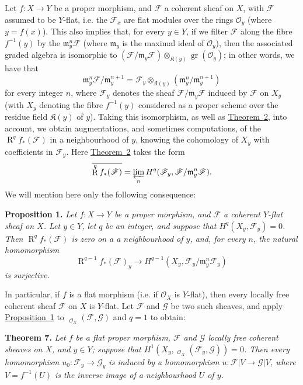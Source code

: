 \documentclass{article}
\newenvironment{itenv}[1]
  {\phantomsection\par\medskip\noindent\textbf{#1.}\itshape}
  {\medskip}
\newcommand{\scr}[1]{{\mathscr{#1}}}
\newcommand{\fk}{\mathfrak}
\newcommand{\kres}{\mathfrak{K}}
\DeclareMathOperator{\RR}{R}
\DeclareMathOperator{\Hom}{Hom}
\DeclareMathOperator{\shHom}{\underline{\Hom}}
\DeclareMathOperator{\gr}{gr}
\newcommand{\oldpage}[1]{\marginpar{\footnotesize$\Big\vert$ \textit{p.~#1}}}
\begin{document}
Let $f\colon X\to Y$ be a proper morphism, and $\scr{F}$ a coherent sheaf on $X$,
\oldpage{182-09}
with $\scr{F}$ assumed to be $Y$-flat, i.e. the $\scr{F}_x$ are flat modules over the rings $\scr{O}_y$ (where $y=f(x)$).
This also implies that, for every $y\in Y$, if we filter $\scr{F}$ along the fibre $f^{-1}(y)$ by the $\fk{m}_y^n\scr{F}$ (where $\fk{m}_y$ is the maximal ideal of $\scr{O}_y$), then the associated graded algebra is isomorphic to $(\scr{F}/\fk{m}_y\scr{F})\otimes_{\kres(y)}\gr(\scr{O}_y)$;
in other words, we have that
\[
  \fk{m}_y^n\scr{F}/\fk{m}_y^{n+1}
  = \scr{F}_y\otimes_{\kres(y)}(\fk{m}_y^n/\fk{m}_y^{n+1})
\]
for every integer $n$, where $\scr{F}_y$ denotes the sheaf $\scr{F}/\fk{m}_y\scr{F}$ induced by $\scr{F}$ on $X_y$ (with $X_y$ denoting the fibre $f^{-1}(y)$ considered as a proper scheme over the residue field $\kres(y)$ of $y$).
Taking this isomorphism, as well as \hyperref[theorem2]{Theorem~2}, into account, we obtain augmentations, and sometimes computations, of the $\RR^q f_*(\scr{F})$ in a neighbourhood of $y$, knowing the cohomology of $X_y$ with coefficients in $\scr{F}_y$.
Here \hyperref[theorem2]{Theorem~2} takes the form
\[
  \overline{\RR^q f_*(\scr{F})} = \varprojlim_n H^q(\scr{F}_y,\scr{F}/\fk{m}_y^n\scr{F}).
\]
We will mention here only the following consequence:

\begin{itenv}{Proposition 1}
\label{proposition1}
  Let $f\colon X\to Y$ be a proper morphism, and $\scr{F}$ a coherent $Y$-flat sheaf on $X$.
  Let $y\in Y$, let $q$ be an integer, and suppose that $H^q(X_y,\scr{F}_y)=0$.
  Then $\RR^q f_*(\scr{F})$ is zero on a a neighbourhood of $y$, and, for every $n$, the natural homomorphism
  \[
    \RR^{q-1}f_*(\scr{F})_y \to H^{q-1}(X_y,\scr{F}_y/\fk{m}_y^n\scr{F}_y)
  \]
  is surjective.
\end{itenv}

In particular, if $f$ is a flat morphism (i.e. if $\scr{O}_X$ is $Y$-flat), then every locally free coherent sheaf $\scr{F}$ on $X$ is $Y$-flat.
Let $\scr{F}$ and $\scr{G}$ be two such sheaves, and apply \hyperref[proposition1]{Proposition~1} to $\shHom_{\scr{O}_X}(\scr{F},\scr{G})$ and $q=1$ to obtain:

\begin{itenv}{Theorem 7}
\label{theorem7}
  Let $f$ be a flat proper morphism, $\scr{F}$ and $\scr{G}$ locally free coherent sheaves on $X$, and $y\in Y$;
  suppose that $H^1(X_y,\shHom_{\scr{O}_X}(\scr{F}_y,\scr{G}))=0$.
  Then every homomorphism $u_0\colon\scr{F}_y\to\scr{G}_y$ is induced by a homomorphism $u\colon\scr{F}|V\to\scr{G}|V$, where $V=f^{-1}(U)$ is the inverse image of a neighbourhood $U$ of $y$.
\end{itenv}
\end{document}

